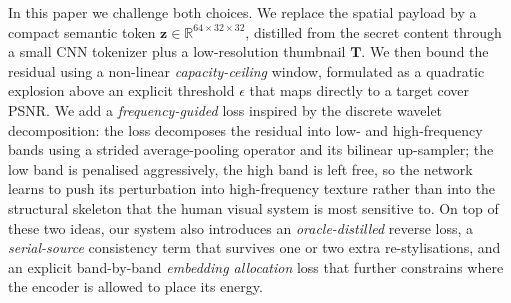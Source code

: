\documentclass[conference]{IEEEtran}
\begin{document}
In this paper we challenge both choices. We replace the spatial payload by a compact semantic token $\mathbf{z}\!\in\!\mathbb{R}^{64\times32\times32}$, distilled from the secret content through a small CNN tokenizer plus a low-resolution thumbnail $\mathbf{T}$. We then bound the residual using a non-linear \emph{capacity-ceiling} window, formulated as a quadratic explosion above an explicit threshold $\epsilon$ that maps directly to a target cover PSNR. We add a \emph{frequency-guided} loss inspired by the discrete wavelet decomposition: the loss decomposes the residual into low- and high-frequency bands using a strided average-pooling operator and its bilinear up-sampler; the low band is penalised aggressively, the high band is left free, so the network learns to push its perturbation into high-frequency texture rather than into the structural skeleton that the human visual system is most sensitive to. On top of these two ideas, our system also introduces an \emph{oracle-distilled} reverse loss, a \emph{serial-source} consistency term that survives one or two extra re-stylisations, and an explicit band-by-band \emph{embedding allocation} loss that further constrains where the encoder is allowed to place its energy.
\end{document}
